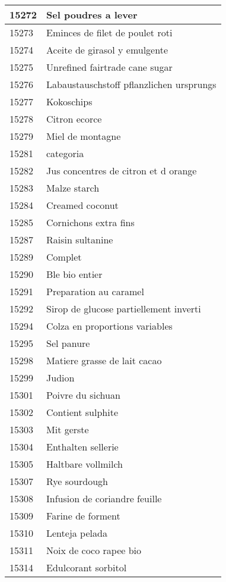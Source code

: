 \begin{longtable}{|l|l|}
15272 & Sel poudres a lever \\ \hline 
15273 & Eminces de filet de poulet roti \\ \hline 
15274 & Aceite de girasol y emulgente \\ \hline 
15275 & Unrefined fairtrade cane sugar \\ \hline 
15276 & Labaustauschstoff pflanzlichen ursprungs \\ \hline 
15277 & Kokoschips \\ \hline 
15278 & Citron ecorce \\ \hline 
15279 & Miel de montagne \\ \hline 
15281 & categoria \\ \hline 
15282 & Jus concentres de citron et d orange \\ \hline 
15283 & Malze starch \\ \hline 
15284 & Creamed coconut \\ \hline 
15285 & Cornichons extra fins \\ \hline 
15287 & Raisin sultanine \\ \hline 
15289 & Complet \\ \hline 
15290 & Ble bio entier \\ \hline 
15291 & Preparation au caramel \\ \hline 
15292 & Sirop de glucose partiellement inverti \\ \hline 
15294 & Colza en proportions variables \\ \hline 
15295 & Sel panure \\ \hline 
15298 & Matiere grasse de lait cacao \\ \hline 
15299 & Judion \\ \hline 
15301 & Poivre du sichuan \\ \hline 
15302 & Contient sulphite \\ \hline 
15303 & Mit gerste \\ \hline 
15304 & Enthalten sellerie \\ \hline 
15305 & Haltbare vollmilch \\ \hline 
15307 & Rye sourdough \\ \hline 
15308 & Infusion de coriandre feuille \\ \hline 
15309 & Farine de forment \\ \hline 
15310 & Lenteja pelada \\ \hline 
15311 & Noix de coco rapee bio \\ \hline 
15314 & Edulcorant sorbitol \\ \hline 

\end{longtable}
